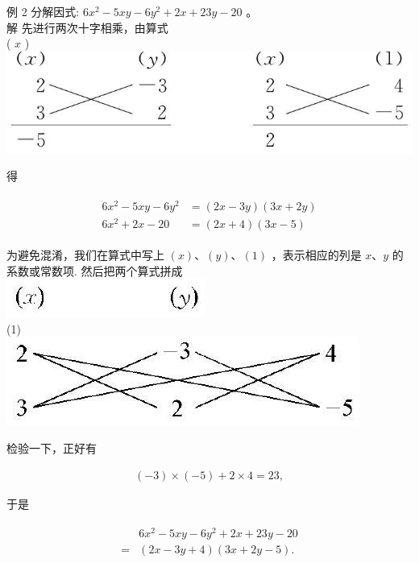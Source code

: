 \documentclass[10pt]{article}
\begin{document}
例 2 分解因式: $6 x^{2}-5 x y-6 y^{2}+2 x+23 y-20$ 。\\
解 先进行两次十字相乘，由算式\\
( $x$ )\\
\includegraphics[max width=\textwidth, center]{2024_10_30_bd799899fef40368a068g-042(1)}

得

\begin{align*}
\begin{aligned}
6 x^{2}-5 x y-6 y^{2} & =(2 x-3 y)(3 x+2 y) \\
6 x^{2}+2 x-20 & =(2 x+4)(3 x-5)
\end{aligned}
\end{align*}

为避免混淆，我们在算式中写上 $(x) 、(y) 、(1)$ ，表示相应的列是 $x 、 y$ 的系数或常数项. 然后把两个算式拼成\\
\includegraphics[max width=\textwidth, center]{2024_10_30_bd799899fef40368a068g-042(3)}\\
(1)\\
\includegraphics[max width=\textwidth, center]{2024_10_30_bd799899fef40368a068g-042(2)}

检验一下，正好有

\begin{align*}
(-3) \times(-5)+2 \times 4=23,
\end{align*}

于是

\begin{align*}
\begin{aligned}
& 6 x^{2}-5 x y-6 y^{2}+2 x+23 y-20 \\
= & (2 x-3 y+4)(3 x+2 y-5) .
\end{aligned}
\end{align*}
\end{document}
